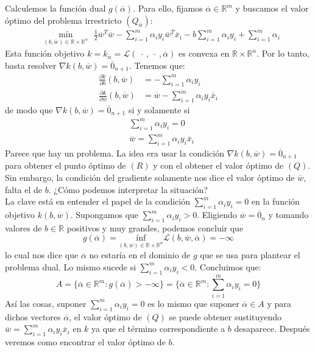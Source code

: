 \documentclass[11pt]{article}
\newcommand{\R}{\mathbb{R}}
\newcommand{\Rn}{\R^{n}}
\newcommand{\Rm}{\R^{m}}
\newcommand{\Rnu}{\R\times\Rn}
\newcommand{\av}{\overline{\alpha}}
\newcommand{\wv}{\overline{w}}
\newcommand{\x}{\overline{x}}
\newcommand{\z}{\overline{0}_{n}}
\newcommand{\La}{\mathcal{L}}
\newcommand{\ali}{\alpha_{i}}
\begin{document}
Calculemos la función dual $g(\av)$. Para ello, fijamos $\av\in\Rm$ y buscamos el valor óptimo del problema irrestricto $(Q_{\av})$:
\begin{equation*}
\begin{aligned}
& \underset{(b, \wv)\in \Rnu}{\text{mín}}\ \ \ \frac{1}{2}\wv^{T}\wv-\sum_{i=1}^{m}\ali y_{i}\wv^{T}\x_{i} -b\sum_{i=1}^{m}\ali y_{i}+\sum_{i=1}^{m}\ali
\end{aligned}
\end{equation*}
Esta función objetivo $k=k_{\av}=\La(\ \cdot\ ,\ \cdot\ ,\av)$ es convexa en $\Rnu$. Por lo tanto, basta resolver $\nabla k(b, \wv)=\overline{0}_{n+1}$.
Tenemos que:
\begin{equation*}
\begin{aligned}
\frac{\partial k}{\partial b}(b, \wv)&=-\sum_{i=1}^{m}\ali y_{i}\\
\frac{\partial k}{\partial \wv}(b, \wv)&=\wv-\sum_{i=1}^{m}\ali y_{i}\x_{i}
\end{aligned}
\end{equation*}
de modo que $\nabla k(b, \wv)=\overline{0}_{n+1}$ si y solamente si
\begin{equation*}
\begin{aligned}
&\sum_{i=1}^{m}\ali y_{i}=0\\
&\wv=\sum_{i=1}^{m}\ali y_{i}\x_{i}
\end{aligned}
\end{equation*}
Parece que hay un problema. La idea era usar la condición $\nabla k(b, \wv)=\overline{0}_{n+1}$ para obtener el punto óptimo de $(R)$ y con el obtener el valor óptimo de $(Q)$. Sin embargo, la condición del gradiente solamente nos dice el valor óptimo de $\wv$, falta el de $b$. ¿Cómo podemos interpretar la situación?\\

La clave está en entender el papel de la condición $\sum_{i=1}^{m}\ali y_{i}=0$ en la función objetivo $k(b, \wv)$. Supongamos que $\sum_{i=1}^{m}\ali y_{i}>0$. Eligiendo $\wv=\z$ y tomando valores de $b\in\R$ positivos y muy grandes, podemos concluir que
$$g(\av)= \underset{(b, \wv)\in\Rnu}{\text{ínf}}\La(b,\wv,\av)=-\infty$$
lo cual nos dice que $\av$ no estaría en el dominio de $g$ que se usa para plantear el problema dual. Lo mismo sucede si $\sum_{i=1}^{m}\ali y_{i}<0$. Concluimos que:
$$A=\{\av\in\Rm: g(\av)>-\infty\}=\{\av\in\Rm: \sum_{i=1}^{m}\ali y_{i}=0\}$$
Así las cosas, suponer $\sum_{i=1}^{m}\ali y_{i}=0$ es lo mismo que suponer $\av\in A$ y para dichos vectores $\av$, el valor óptimo de $(Q)$ se puede obtener sustituyendo $\wv=\sum_{i=1}^{m}\ali y_{i}\x_{i}$ en $k$ ya que el término correspondiente a $b$ desaparece. Después veremos como encontrar el valor óptimo de $b$.\\
\end{document}
